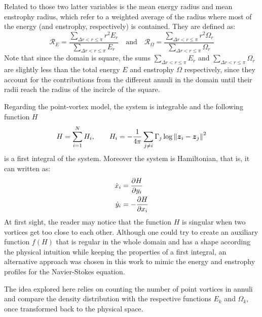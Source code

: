 \documentclass[../main.tex]{subfiles}
\begin{document}
Related to those two latter variables is the mean energy radius and mean enstrophy radius, which refer to a weighted average of the radius where most of the energy (and enstrophy, respectively) is contained. They are defined as:
\begin{equation}
	\mathcal{R}_E      = \frac{\sum_{\Delta r<r\leq \pi} r^2 E_r}{\sum_{\Delta r<r\leq \pi} E_r}\quad \text{and}  \quad
	\mathcal{R}_\Omega = \frac{\sum_{\Delta r<r\leq \pi} r^2 \Omega_r}{\sum_{\Delta r<r\leq \pi} \Omega_r}
\end{equation}
Note that since the domain is square, the sums $\sum_{\Delta r<r\leq \pi}  E_r$ and $\sum_{\Delta r<r\leq \pi}  \Omega_r$ are slightly less than the total energy $E$ and enstrophy $\Omega$ respectively, since they account for the contributions from the different annuli in the domain until their radii reach the radius of the incircle of the square.

Regarding the point-vortex model, the system is integrable and the following function $H$
\begin{equation}
	H = \sum_{i=1}^{N} H_i,\qquad H_i = -\frac{1}{4\pi} \sum_{j\neq i} \Gamma_j \log{\left\|\boldsymbol{z}_i-\boldsymbol{z}_j\right\|^2}
\end{equation}
is a first integral of the system. Moreover the system is Hamiltonian, that is, it can written as:
\begin{align}
	\dot{x}_i & = \pdv{H}{y_i}  \\
	\dot{y}_i & = -\pdv{H}{x_i}
\end{align}
At first sight, the reader may notice that the function $H$ is singular when two vortices get too close to each other. Although one could try to create an auxiliary function $f(H)$ that is regular in the whole domain and has a shape according the physical intuition while keeping the properties of a first integral, an alternative approach was chosen in this work to mimic the energy and enstrophy profiles for the Navier-Stokes equation.

The idea explored here relies on counting the number of point vortices in annuli and compare the density distribution with the respective functions $E_k$ and $\Omega_k$, once transformed back to the physical space.
\end{document}
